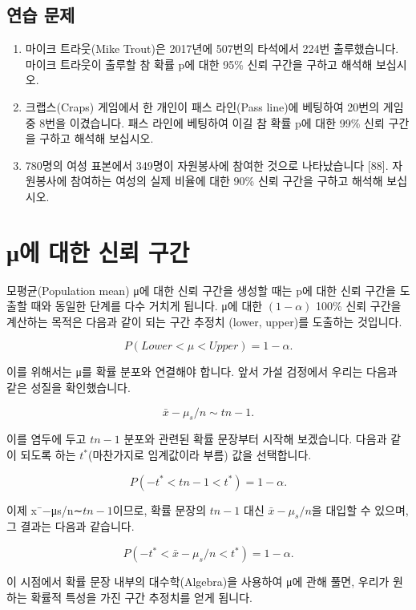 \documentclass[
]{scrbook}
\providecommand{\tightlist}{%
  \setlength{\itemsep}{0pt}\setlength{\parskip}{0pt}}
\begin{document}
\subsection{연습 문제}\label{uxc5f0uxc2b5-uxbb38uxc81c}

\begin{enumerate}
\def\labelenumi{\arabic{enumi}.}
\tightlist
\item
  마이크 트라웃(Mike Trout)은 2017년에 507번의 타석에서 224번
  출루했습니다. 마이크 트라웃이 출루할 참 확률 p에 대한 95\% 신뢰 구간을
  구하고 해석해 보십시오.
\item
  크랩스(Craps) 게임에서 한 개인이 패스 라인(Pass line)에 베팅하여
  20번의 게임 중 8번을 이겼습니다. 패스 라인에 베팅하여 이길 참 확률 p에
  대한 99\% 신뢰 구간을 구하고 해석해 보십시오.
\item
  780명의 여성 표본에서 349명이 자원봉사에 참여한 것으로 나타났습니다
  {[}88{]}. 자원봉사에 참여하는 여성의 실제 비율에 대한 90\% 신뢰 구간을
  구하고 해석해 보십시오.
\end{enumerate}

\section{μ에 대한 신뢰
구간}\label{ux3bcuxc5d0-uxb300uxd55c-uxc2e0uxb8b0-uxad6cuxac04}

모평균(Population mean) μ에 대한 신뢰 구간을 생성할 때는 p에 대한 신뢰
구간을 도출할 때와 동일한 단계를 다수 거치게 됩니다. μ에 대한
\((1-\alpha)\) 100\% 신뢰 구간을 계산하는 목적은 다음과 같이 되는 구간
추정치 (lower, upper)를 도출하는 것입니다.

\[
P(Lower<\mu<Upper)=1-\alpha.
\]

이를 위해서는 μ를 확률 분포와 연결해야 합니다. 앞서 가설 검정에서 우리는
다음과 같은 성질을 확인했습니다.

\[
\bar{x}-\mu_{s}/n∼tn-1.
\]

이를 염두에 두고 \(tn-1\) 분포와 관련된 확률 문장부터 시작해 보겠습니다.
다음과 같이 되도록 하는 \(t^*\)(마찬가지로 임계값이라 부름) 값을
선택합니다.

\[
P(-t^*<tn-1<t^*)=1-\alpha.
\]

이제 x¯−μs/n∼\(tn-1\)이므로, 확률 문장의 \(tn-1\) 대신
\(\bar{x}-\mu_{s}/n\)을 대입할 수 있으며, 그 결과는 다음과 같습니다.

\[
P(-t^*<\bar{x}-\mu_{s}/n<t^*)=1-\alpha.
\]

이 시점에서 확률 문장 내부의 대수학(Algebra)을 사용하여 μ에 관해 풀면,
우리가 원하는 확률적 특성을 가진 구간 추정치를 얻게 됩니다.
\end{document}
